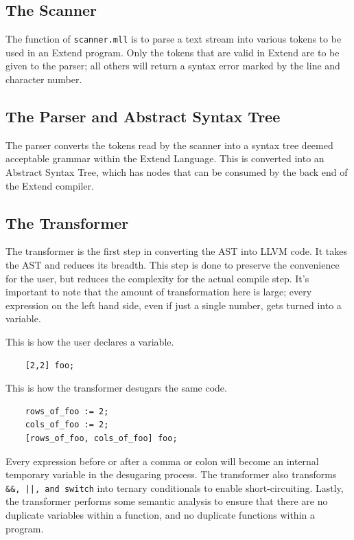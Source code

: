   \subsection{The Scanner}
  The function of \texttt{scanner.mll} is to parse a text stream into various tokens to be used in an Extend program.
  Only the tokens that are valid in Extend are to be given to the parser; all others will return a syntax error marked by the line and character number.

  \subsection{The Parser and Abstract Syntax Tree}
  The parser converts the tokens read by the scanner into a syntax tree deemed acceptable grammar within the Extend Language. This is converted into an Abstract Syntax Tree, which has nodes that can be consumed by the back end of the Extend compiler.

  \subsection{The Transformer}
The transformer is the first step in converting the AST into LLVM code. It takes the AST and reduces its breadth. This step is done to preserve the convenience for the user, but reduces the complexity for the actual compile step. It's important to note that the amount of transformation here is large; every expression on the left hand side, even if just a single number, gets turned into a variable.

  \medskip \noindent This is how the user declares a variable.
  \begin{lstlisting}
    [2,2] foo;
  \end{lstlisting}

  \medskip \noindent This is how the transformer desugars the same code.
  \begin{lstlisting}
    rows_of_foo := 2;
    cols_of_foo := 2;
    [rows_of_foo, cols_of_foo] foo;
  \end{lstlisting}

  \medskip \noindent
  Every expression before or after a comma or colon will become an internal temporary variable in the desugaring process. The transformer also transforms \texttt{\&\&, ||, and switch} into ternary conditionals to enable short-circuiting. Lastly, the transformer performs some semantic analysis to ensure that there are no duplicate variables within a function, and no duplicate functions within a program.

